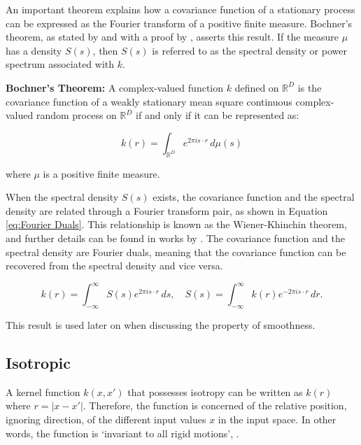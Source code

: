\documentclass[12pt,a4paper]{article}
\begin{document}
An important theorem explains how a covariance function of a stationary process can be expressed as the Fourier transform of a positive finite measure. Bochner's theorem, as stated by \citet{stein1999interpolation} and with a proof by \citet{Gihman2004}, asserts this result. If the measure \(\mu\) has a density \(S(s)\), then \(S(s)\) is referred to as the spectral density or power spectrum associated with \(k\).

\textbf{Bochner's Theorem:} A complex-valued function \( k \) defined on \( \mathbb{R}^D \) is the covariance function of a weakly stationary mean square continuous complex-valued random process on \( \mathbb{R}^D \) if and only if it can be represented as:

\begin{equation}
k(r) = \int_{\mathbb{R}^D} e^{2\pi i s \cdot r} \, d\mu(s)
\end{equation}

where \( \mu \) is a positive finite measure.

When the spectral density \(S(s)\) exists, the covariance function and the spectral density are related through a Fourier transform pair, as shown in Equation \eqref{eq:Fourier Duals}. This relationship is known as the Wiener-Khinchin theorem, and further details can be found in works by \citet{chatfield2019analysis}. The covariance function and the spectral density are Fourier duals, meaning that the covariance function can be recovered from the spectral density and vice versa.

\begin{equation}
k(r) = \int_{-\infty}^{\infty} S(s) e^{2\pi i s \cdot r} \, ds, \quad S(s) = \int_{-\infty}^{\infty} k(r) e^{-2\pi i s \cdot r} \, dr.
\label{eq:Fourier Duals}
\end{equation}

This result is used later on when discussing the property of smoothness. 

\subsection{Isotropic}

A kernel function \(k(x,x')\) that possesses isotropy can be written as \(k(r)\) where \(r = |x - x'|\). Therefore, the function is concerned of the relative position, ignoring direction, of the different input values \(x\) in the input space.  In other words, the function is `invariant to all rigid motions', \citep[pp.~80]{williams2006gaussian}.
\end{document}
